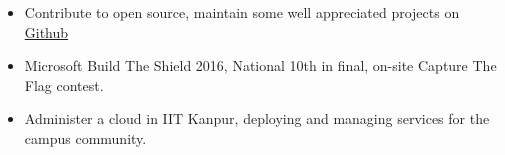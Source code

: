 \vspace{-0.3cm}

{\fontsize{11pt}{1em}\bodyfontlight\upshape\color{text}
\begin{itemize}
  \itemsep-0.3em
  \item Contribute to open source, maintain some well appreciated
    projects on \href{https://github.com/sakshamsharma}{Github}
  \item Microsoft Build The Shield 2016, National 10th in final,
    on-site Capture The Flag contest.
  \item Administer a cloud in IIT Kanpur, deploying and managing services for the campus community.
\end{itemize}
}

